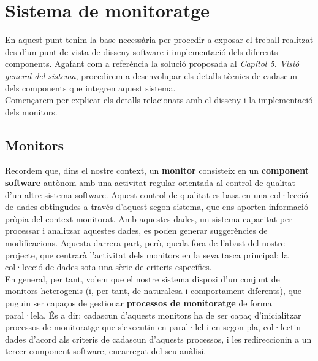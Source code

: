 
\chapter{Sistema de monitoratge} %

\label{SistemaMonitoratge} %

En aquest punt tenim la base necessària per procedir a exposar el treball realitzat des d'un punt de vista de disseny software i implementació dels diferents components. Agafant com a referència la solució proposada al \textit{Capítol 5. Visió general del sistema}, procedirem a desenvolupar els detalls tècnics de cadascun dels components que integren aquest sistema.\\

Començarem per explicar els detalls relacionats amb el disseny i la implementació dels monitors.

\section{Monitors}

Recordem que, dins el nostre context, un \textbf{monitor} consisteix en un \textbf{component software} autònom amb una activitat regular orientada al control de qualitat d'un altre sistema software. Aquest control de qualitat es basa en una col·lecció de dades obtingudes a través d'aquest segon sistema, que ens aporten informació pròpia del context monitorat. Amb aquestes dades, un sistema capacitat per processar i analitzar aquestes dades, es poden generar suggerències de modificacions. Aquesta darrera part, però, queda fora de l'abast del nostre projecte, que centrarà l'activitat dels monitors en la seva tasca principal: la col·lecció de dades sota una sèrie de criteris específics.\\

En general, per tant, volem que el nostre sistema disposi d'un conjunt de monitors heterogenis (i, per tant, de naturalesa i comportament diferents), que puguin ser capaços de gestionar \textbf{processos de monitoratge} de forma paral·lela. És a dir: cadascun d'aquests monitors ha de ser capaç d'inicialitzar processos de monitoratge que s'executin en paral·lel i en segon pla, col·lectin dades d'acord als criteris de cadascun d'aquests processos, i les redireccionin a un tercer component software, encarregat del seu anàlisi.\\

